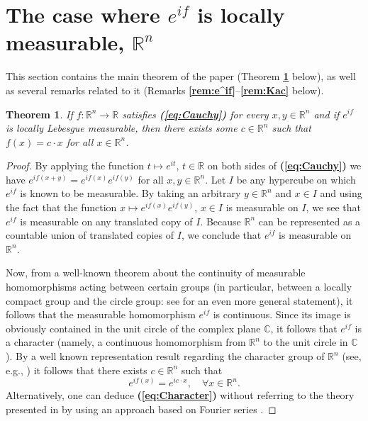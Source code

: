 \documentclass[12 pt]{amsart}
\newtheorem{thm}{Theorem}[section]
\theoremstyle{definition}
\newcommand{\R}{\mathbb{R}}
\newcommand{\C}{\mathbb{C}}
\newcommand{\bref}[1]{\textbf{\ref{#1}}} %
\newcommand{\beqref}[1]{\textbf{(\ref{#1})}} %
\begin{document}
\section{The case where $e^{if}$ is locally measurable, $\R^n$}\label{sec:Measurable}
 This section contains the main theorem of the paper (Theorem \bref{thm:CauchyMeasurable} below), as well as several remarks related to it (Remarks \bref{rem:e^if}--\bref{rem:Kac} below). 
\begin{thm}\label{thm:CauchyMeasurable}
If $f:\R^n\to \R$ satisfies \beqref{eq:Cauchy} for every $x,y\in\R^n$ and if $e^{if}$ is locally Lebesgue measurable, then there exists some $c\in \R^n$ such that $f(x)=c\cdot x$ for all $x\in \R^n$.
\end{thm}

\begin{proof}
By applying the function $t\mapsto e^{it}$, $t\in\R$ on both sides of \beqref{eq:Cauchy} we have  $e^{if(x+y)}=e^{if(x)}e^{if(y)}$ 
 for all $x,y\in \R^n$. Let $I$ be any hypercube on which $e^{if}$ is known to be measurable. By taking an arbitrary $y\in\R^n$ and $x\in I$ and using the fact that the function $x\mapsto e^{if(x)}e^{if(y)}$, $x\in I$ is measurable on $I$, we see that $e^{if}$ is  measurable on any translated  copy of $I$. Because $\R^n$ can be represented as a countable union of translated copies of $I$, we conclude that $e^{if}$ is measurable on $\R^n$. 

Now, from a well-known theorem about the continuity of measurable homomorphisms acting between certain groups 
(in particular, between a locally compact  group and the circle group: see  \cite[p. 346]{HewittRoss} for an even more general statement), it follows that the measurable homomorphism $e^{if}$ is continuous. Since its image is 
obviously contained in the unit circle of the complex plane $\C$, it follows that $e^{if}$ is a character (namely, a continuous homomorphism from $\R^n$ to the unit circle in $\C$).
 By a well known representation result regarding the character group of $\R^n$ (see, e.g., \cite[pp. 366--368]{HewittRoss}) it follows that there exists $c\in \R^n$ such 
that 
\begin{equation}\label{eq:Character}
e^{if(x)}=e^{ic\cdot x},\quad \forall x\in \R^n. 
\end{equation}
Alternatively,  one can deduce \beqref{eq:Character} 
 without referring to the theory presented in \cite{HewittRoss} by using 
 an approach based on Fourier series \cite{ReemCharacterFourier}. 
 

\end{proof}
\end{document}

